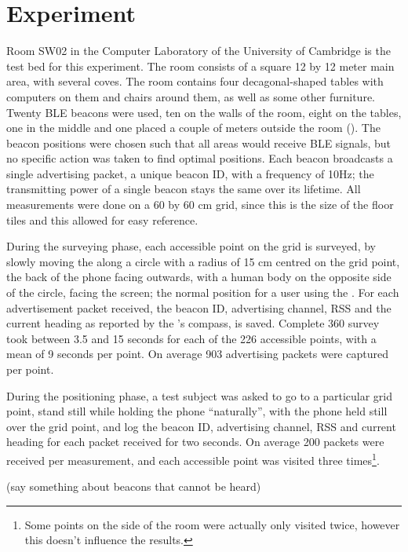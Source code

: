 \section{Experiment}
\label{sec:architecture-experiment}
Room SW02 in the Computer Laboratory of the University of Cambridge is the test bed for this experiment.
The room consists of a square 12 by 12 meter main area, with several coves.
The room contains four decagonal-shaped tables with computers on them and chairs around them, as well as some other furniture.
Twenty BLE beacons were used, ten on the walls of the room, eight on the tables, one in the middle and one placed a couple of meters outside the room ().
The beacon positions were chosen such that all areas would receive BLE signals, but no specific action was taken to find optimal positions.
Each beacon broadcasts a single advertising packet, a unique beacon ID, with a frequency of 10Hz; the transmitting power of a single beacon stays the same over its lifetime.
All measurements were done on a 60 by 60 cm grid, since this is the size of the floor tiles and this allowed for easy reference.

During the surveying phase, each accessible point on the grid is surveyed, by slowly moving the \device along a circle with a radius of 15 cm centred on the grid point, the back of the phone facing outwards, with a human body on the opposite side of the circle, facing the screen; the normal position for a user using the \device.
For each advertisement packet received, the beacon ID, advertising channel, RSS and the current heading as reported by the \device's compass, is saved.
Complete 360\textdegree{} survey took between 3.5 and 15 seconds for each of the 226 accessible points, with a mean of 9 seconds per point.
On average 903 advertising packets were captured per point.

During the positioning phase, a test subject was asked to go to a particular grid point, stand still while holding the phone ``naturally'', with the phone held still over the grid point, and log the beacon ID, advertising channel, RSS and current heading for each packet received for two seconds.
On average 200 packets were received per measurement, and each accessible point was visited three times\footnote{Some points on the side of the room were actually only visited twice, however this doesn't influence the results.}.

(say something about beacons that cannot be heard)

